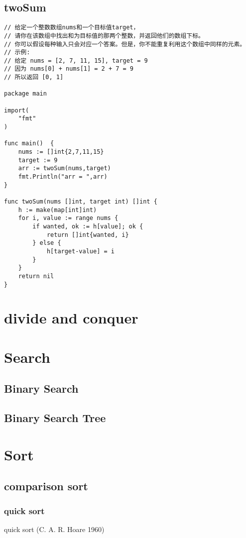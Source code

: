 \documentclass[oneside,12pt,twiside,a4paper]{ctexbook}
\begin{document}
\section{twoSum}
\begin{lstlisting}
// 给定一个整数数组nums和一个目标值target，
// 请你在该数组中找出和为目标值的那两个整数，并返回他们的数组下标。
// 你可以假设每种输入只会对应一个答案。但是，你不能重复利用这个数组中同样的元素。
// 示例:
// 给定 nums = [2, 7, 11, 15], target = 9
// 因为 nums[0] + nums[1] = 2 + 7 = 9
// 所以返回 [0, 1]

package main

import(
	"fmt"
)

func main()  {
	nums := []int{2,7,11,15}
	target := 9
	arr := twoSum(nums,target)
	fmt.Println("arr = ",arr)
}

func twoSum(nums []int, target int) []int {
    h := make(map[int]int)
    for i, value := range nums {
        if wanted, ok := h[value]; ok {
            return []int{wanted, i}
        } else {
            h[target-value] = i
        }
    }
    return nil
}
\end{lstlisting}

%
\chapter{divide and conquer}

%
\chapter{Search}
\section{Binary Search}
\section{Binary Search Tree}


\chapter{Sort}
\section{comparison sort}
%
\subsection{quick sort}
quick sort (C. A. R. Hoare 1960) 
\end{document}
